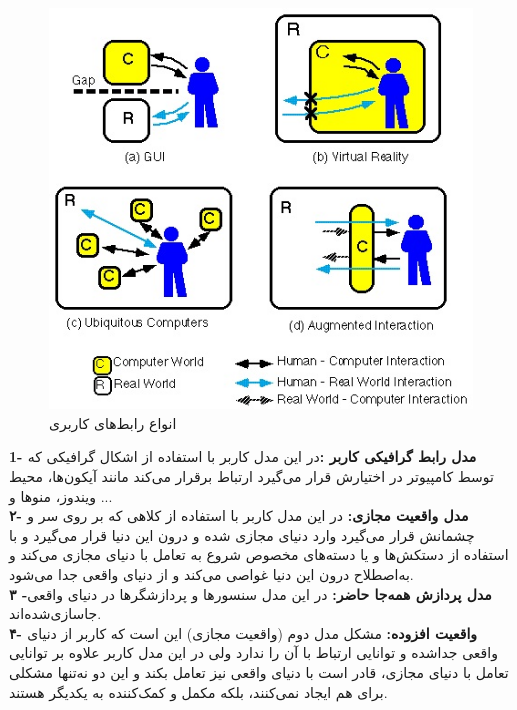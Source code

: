 \begin{figure}[tb]
	\centering
	\includegraphics[width=1\linewidth]{image/style}
	\caption {انواع رابط‌های کاربری\cite{Rekimoto}}
	\label{fig:Rekimoto}
\end{figure}
\textbf{1- مدل رابط گرافیکی کاربر :}در این مدل کاربر با استفاده از اشکال گرافیکی که توسط کامپیوتر در اختیارش قرار می‌گیرد ارتباط برقرار می‌کند مانند آیکون‌ها، محیط ویندوز، منوها و ...
\\
\textbf{
	۲- مدل واقعیت مجازی: }در این مدل کاربر با استفاده از کلاهی که بر روی سر و چشمانش قرار می‌گیرد وارد دنیای مجازی شده و درون این دنیا قرار می‌گیرد و با استفاده از دستکش‌ها و یا دسته‌های مخصوص شروع به تعامل با دنیای مجازی می‌کند و به‌اصطلاح درون این دنیا غواصی می‌کند و از دنیای واقعی جدا می‌شود.
\\
\textbf{۳ -مدل پردازش همه‌جا حاضر: }در این مدل سنسورها و پردازشگرها در دنیای واقعی جاسازی‌شده‌اند.
\\
\textbf{
	۴- واقعیت افزوده:} مشکل مدل دوم (واقعیت مجازی) این است که کاربر از دنیای واقعی جداشده و توانایی ارتباط با آن را ندارد ولی در این مدل کاربر علاوه بر توانایی تعامل با دنیای مجازی، قادر است با دنیای واقعی نیز تعامل بکند و این دو نه‌تنها مشکلی برای هم ایجاد نمی‌کنند، بلکه مکمل و کمک‌کننده به یکدیگر هستند.
\\
